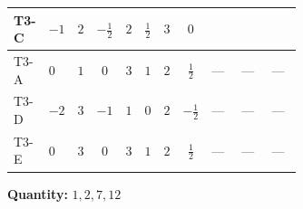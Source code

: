 \documentclass[8pt]{article}
\begin{document}
\begin{landscape}
\begin{longtable}{@{}llcccccc >{\raggedright\arraybackslash}p{0.21\linewidth} >{\raggedright\arraybackslash}p{0.21\linewidth} >{\raggedright\arraybackslash}p{0.21\linewidth}@{}}
T3-C & $-1$ & $2$ & $-\frac{1}{2}$ & $2$ & $\frac{1}{2}$ & $3$ & $0$ & \scriptsize\adjustbox{max width=\linewidth}{$\begin{gathered} \frac{i lambda12Inv2 \overline{y_{1}} \overline{y_{2}}}{6 MF}\end{gathered}$} & \scriptsize\adjustbox{max width=\linewidth}{$\begin{gathered} \frac{\sqrt{3} i g_{2}^{2} \overline{y_{1}} \overline{y_{2}}}{8 MF}\end{gathered}$} & \scriptsize\adjustbox{max width=\linewidth}{$\begin{gathered} - \frac{\sqrt{3} i ye \overline{y_{1}} \overline{y_{2}} \overline{ye}}{24 MF}\end{gathered}$} \\
\midrule
T3-A & $0$ & $1$ & $0$ & $3$ & $1$ & $2$ & $\frac{1}{2}$ & --- & --- & --- \\
\midrule
T3-D & $-2$ & $3$ & $-1$ & $1$ & $0$ & $2$ & $-\frac{1}{2}$ & --- & --- & --- \\
\midrule
T3-E & $0$ & $3$ & $0$ & $3$ & $1$ & $2$ & $\frac{1}{2}$ & --- & --- & --- \\
\midrule
\bottomrule
\end{longtable}
\clearpage
\noindent\textbf{Quantity: }$\mathrm{1,2,7,12}$\par\smallskip

\end{landscape}
\end{document}
